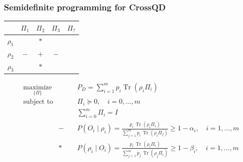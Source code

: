 \documentclass{beamer}
\begin{document}
\begin{frame}
    \frametitle{Semidefinite programming for CrossQD}
    \begin{table}[ht]
        \begin{tabular}{c | c c c c}
                       & $\Pi_{1}$              & $\Pi_{2}$                 & $\Pi_{3}$               & $\Pi_{?}$             \\
            \hline
            $\rho_{1}$ & \cellcolor{green!20}   & \cellcolor{red!20}    $*$ & \cellcolor{red!20}      & \cellcolor{yellow!30} \\
            $\rho_{2}$ & \cellcolor{red!20} $-$ & \cellcolor{green!20} $+$  & \cellcolor{red!20}  $-$ & \cellcolor{yellow!30} \\
            $\rho_{3}$ & \cellcolor{red!20}     & \cellcolor{red!20}   $*$  & \cellcolor{green!20}    & \cellcolor{yellow!30} \\
        \end{tabular}
    \end{table}
    {
    \scriptsize
    \begin{align}
         & \underset{\{\Pi\}}{\text{maximize}} &            & P_{D}=\sum_{i=1}^{m} p_{i} \operatorname{Tr}(\rho_{i} \Pi_{i})                                                                                                      \\
         & \text{subject to}                   &            & \Pi_{i} \succeq 0, \quad i = 0, \ldots, m                                                                                                                           \\
         &                                     &            & \sum_{i=0}^{m} \Pi_i = I                                                                                                                                            \\
         &                                     & - \;\;\;\; & P(O_i \mid \rho_i) = \frac{p_i \, \operatorname{Tr}(\rho_i \Pi_i)}{\sum_{j=1}^{m} p_i \, \operatorname{Tr}(\rho_i \Pi_j)} \geq 1 - \alpha_i, \quad i = 1, \ldots, m \\
         &                                     & * \;\;\;\; & P(\rho_i \mid O_i) = \frac{p_i \, \operatorname{Tr}(\rho_i \Pi_i)}{\sum_{j=1}^{m} p_j \, \operatorname{Tr}(\rho_j \Pi_i)} \geq 1 - \beta_i, \quad i = 1, \ldots, m
    \end{align}
    }
\end{frame}
\end{document}
